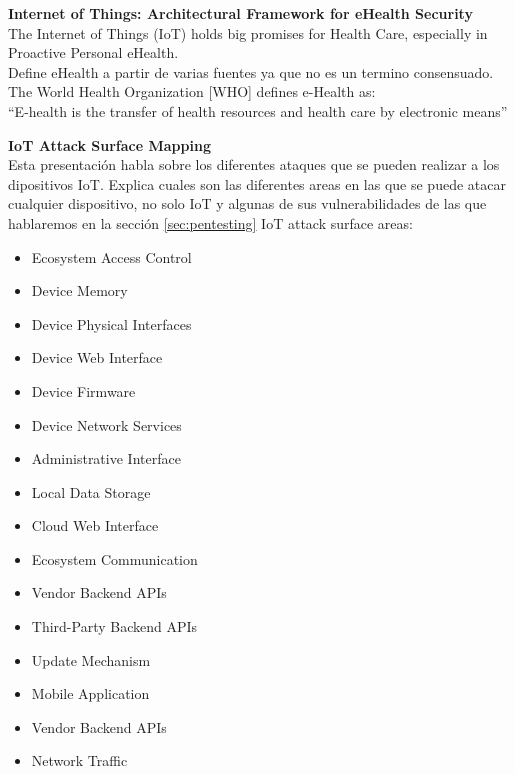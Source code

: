 \textbf{Internet of Things: Architectural Framework	for eHealth Security}\cite{Paper8}\\
The Internet of Things (IoT) holds big promises for Health Care, especially in Proactive Personal eHealth.\\
Define eHealth a partir de varias fuentes ya que no es un termino consensuado.
The World Health Organization [WHO] defines e-Health as:\\
``E-health is the transfer of health resources and health care by electronic means''


\textbf{IoT Attack Surface Mapping}\cite{Presentation1}\\
Esta presentación habla sobre los diferentes ataques que se pueden realizar a los dipositivos IoT.
Explica cuales son las diferentes areas en las que se puede atacar cualquier dispositivo, no solo IoT y algunas de sus vulnerabilidades de las que hablaremos en la sección \ref{sec:pentesting}
IoT attack surface areas:
\begin{itemize}
	\item Ecosystem Access Control
	\item Device Memory
	\item Device Physical Interfaces
	\item Device Web Interface
	\item Device Firmware
	\item Device Network Services
	\item Administrative Interface
	\item Local Data Storage
	\item Cloud Web Interface
	\item Ecosystem Communication
	\item Vendor Backend APIs
	\item Third-Party Backend APIs
	\item Update Mechanism
	\item Mobile Application
	\item Vendor Backend APIs
	\item Network Traffic
\end{itemize}

